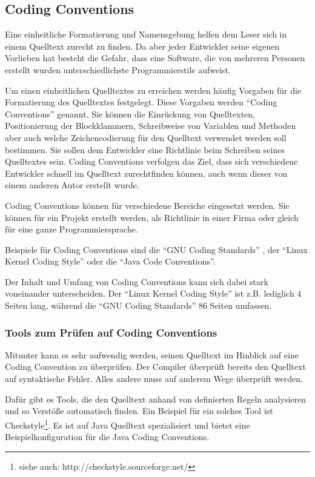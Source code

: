 \subsection{Coding Conventions}

Eine einheitliche Formatierung und Namensgebung helfen dem Leser sich in einem Quelltext zurecht zu finden. Da aber jeder Entwickler seine eigenen Vorlieben hat besteht die Gefahr, dass eine Software, die von mehreren Personen erstellt wurden unterschiedlichste Programmierstile aufweist. 

Um einen einheitlichen Quelltextes zu erreichen werden häufig Vorgaben für die Formatierung des Quelltextes festgelegt. Diese Vorgaben werden \enquote{Coding Conventions} genannt. Sie können die Einrückung von Quelltexten,
Positionierung der Blockklammern, Schreibweise von Variablen und Methoden aber auch
welche Zeichencodierung für den Quelltext verwendet werden soll bestimmen. Sie sollen dem Entwickler eine Richtlinie beim Schreiben seines Quelltextes sein. Coding Conventions verfolgen das Ziel, dass sich verschiedene Entwickler schnell im Quelltext zurechtfinden können, auch wenn dieser von einem anderen Autor erstellt wurde.

Coding Conventions können für verschiedene Bereiche eingesetzt werden. Sie können für
ein Projekt erstellt werden, als Richtlinie in einer Firma oder gleich für eine ganze Programmiersprache.

Beispiele für Coding Conventions sind die \enquote{GNU Coding Standards} \cite{GNUCode},
der \enquote{Linux Kernel Coding Style}\cite{KernelCode} oder die \enquote{Java Code Conventions}\cite{javacode}.

Der Inhalt und Umfang von Coding Conventions kann sich dabei stark voneinander
unterscheiden. Der \enquote{Linux Kernel Coding Style} ist z.B. lediglich 4 Seiten lang,
während die \enquote{GNU Coding Standards} 86 Seiten umfassen.

\subsubsection{Tools zum Prüfen auf Coding Conventions}


Mitunter kann es sehr aufwendig werden, seinen Quelltext im Hinblick auf eine Coding Convention zu überprüfen. Der Compiler überprüft bereits den Quelltext auf  syntaktische Fehler. Alles andere muss auf anderem Wege überprüft werden.

Dafür gibt es Tools, die den Quelltext anhand von definierten Regeln analysieren
und so Verstöße automatisch finden. Ein Beispiel für ein solches Tool ist Checkstyle\footnote{siehe auch: http://checkstyle.sourceforge.net/}.
Es ist auf Java Quelltext spezialisiert und bietet eine Beispielkonfiguration für
die Java Coding Conventions.

